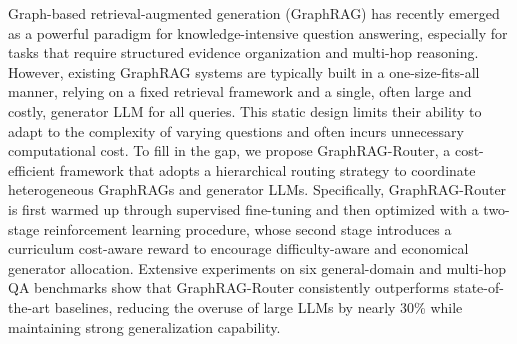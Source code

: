 Graph-based retrieval-augmented generation (GraphRAG) has recently emerged as a powerful paradigm for knowledge-intensive question answering, especially for tasks that require structured evidence organization and multi-hop reasoning. However, existing GraphRAG systems are typically built in a one-size-fits-all manner, relying on a fixed retrieval framework and a single, often large and costly, generator LLM for all queries. This static design limits their ability to adapt to the complexity of varying questions and often incurs unnecessary computational cost. To fill in the gap, we propose GraphRAG-Router, a cost-efficient framework that adopts a hierarchical routing strategy to coordinate heterogeneous GraphRAGs and generator LLMs. Specifically, GraphRAG-Router is first warmed up through supervised fine-tuning and then optimized with a two-stage reinforcement learning procedure, whose second stage introduces a curriculum cost-aware reward to encourage difficulty-aware and economical generator allocation. Extensive experiments on six general-domain and multi-hop QA benchmarks show that GraphRAG-Router consistently outperforms state-of-the-art baselines, reducing the overuse of large LLMs by nearly 30\% while maintaining strong generalization capability.

